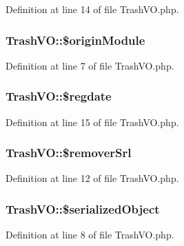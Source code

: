 Definition at line 14 of file Trash\-V\-O.\-php.

\hypertarget{classTrashVO_ad977787e04708af64f4c9d4891d3f682}{
\subsubsection[{\$origin\-Module}]{\setlength{\rightskip}{0pt plus 5cm}Trash\-V\-O\-::\$origin\-Module}}\label{classTrashVO_ad977787e04708af64f4c9d4891d3f682}


Definition at line 7 of file Trash\-V\-O.\-php.

\hypertarget{classTrashVO_a54388f0f415f3e5c302eec871e790434}{
\subsubsection[{\$regdate}]{\setlength{\rightskip}{0pt plus 5cm}Trash\-V\-O\-::\$regdate}}\label{classTrashVO_a54388f0f415f3e5c302eec871e790434}


Definition at line 15 of file Trash\-V\-O.\-php.

\hypertarget{classTrashVO_aa51410763a3b44a76853d8a347793903}{
\subsubsection[{\$remover\-Srl}]{\setlength{\rightskip}{0pt plus 5cm}Trash\-V\-O\-::\$remover\-Srl}}\label{classTrashVO_aa51410763a3b44a76853d8a347793903}


Definition at line 12 of file Trash\-V\-O.\-php.

\hypertarget{classTrashVO_ac3834ed43d01357398d5a0d7f5a9c698}{
\subsubsection[{\$serialized\-Object}]{\setlength{\rightskip}{0pt plus 5cm}Trash\-V\-O\-::\$serialized\-Object}}\label{classTrashVO_ac3834ed43d01357398d5a0d7f5a9c698}


Definition at line 8 of file Trash\-V\-O.\-php.

